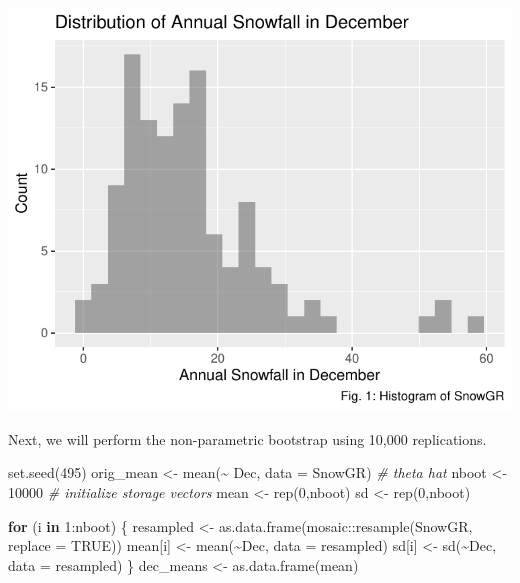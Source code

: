 \documentclass[12pt]{article}
\newenvironment{Shaded}{\begin{snugshade}}{\end{snugshade}}
\newcommand{\AttributeTok}[1]{\textcolor[rgb]{0.77,0.63,0.00}{#1}}
\newcommand{\CommentTok}[1]{\textcolor[rgb]{0.56,0.35,0.01}{\textit{#1}}}
\newcommand{\ConstantTok}[1]{\textcolor[rgb]{0.00,0.00,0.00}{#1}}
\newcommand{\ControlFlowTok}[1]{\textcolor[rgb]{0.13,0.29,0.53}{\textbf{#1}}}
\newcommand{\DecValTok}[1]{\textcolor[rgb]{0.00,0.00,0.81}{#1}}
\newcommand{\FunctionTok}[1]{\textcolor[rgb]{0.00,0.00,0.00}{#1}}
\newcommand{\NormalTok}[1]{#1}
\newcommand{\OtherTok}[1]{\textcolor[rgb]{0.56,0.35,0.01}{#1}}
\newcommand{\SpecialCharTok}[1]{\textcolor[rgb]{0.00,0.00,0.00}{#1}}
\begin{document}
\includegraphics{paper_files/figure-latex/SnowGR histogram-1.pdf}

Next, we will perform the non-parametric bootstrap using 10,000
replications.

\begin{Shaded}
\begin{Highlighting}[]
\FunctionTok{set.seed}\NormalTok{(}\DecValTok{495}\NormalTok{)}
\NormalTok{orig\_mean }\OtherTok{\textless{}{-}} \FunctionTok{mean}\NormalTok{(}\SpecialCharTok{\textasciitilde{}}\NormalTok{ Dec, }\AttributeTok{data =}\NormalTok{ SnowGR) }\CommentTok{\# theta hat}
\NormalTok{nboot }\OtherTok{\textless{}{-}} \DecValTok{10000}
\CommentTok{\# initialize storage vectors}
\NormalTok{mean }\OtherTok{\textless{}{-}} \FunctionTok{rep}\NormalTok{(}\DecValTok{0}\NormalTok{,nboot)}
\NormalTok{sd }\OtherTok{\textless{}{-}} \FunctionTok{rep}\NormalTok{(}\DecValTok{0}\NormalTok{,nboot)}

\ControlFlowTok{for}\NormalTok{ (i }\ControlFlowTok{in} \DecValTok{1}\SpecialCharTok{:}\NormalTok{nboot) \{}
\NormalTok{  resampled }\OtherTok{\textless{}{-}} \FunctionTok{as.data.frame}\NormalTok{(mosaic}\SpecialCharTok{::}\FunctionTok{resample}\NormalTok{(SnowGR, }\AttributeTok{replace =} \ConstantTok{TRUE}\NormalTok{))}
\NormalTok{  mean[i] }\OtherTok{\textless{}{-}} \FunctionTok{mean}\NormalTok{(}\SpecialCharTok{\textasciitilde{}}\NormalTok{Dec, }\AttributeTok{data =}\NormalTok{ resampled)}
\NormalTok{  sd[i] }\OtherTok{\textless{}{-}} \FunctionTok{sd}\NormalTok{(}\SpecialCharTok{\textasciitilde{}}\NormalTok{Dec, }\AttributeTok{data =}\NormalTok{ resampled)}
\NormalTok{\}}
\NormalTok{dec\_means }\OtherTok{\textless{}{-}} \FunctionTok{as.data.frame}\NormalTok{(mean)}
\end{Highlighting}
\end{Shaded}
\end{document}
